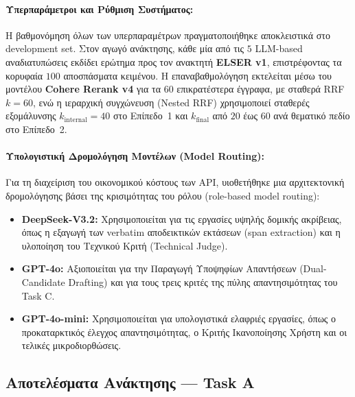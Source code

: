 \paragraph{Υπερπαράμετροι και Ρύθμιση Συστήματος:}
Η βαθμονόμηση όλων των υπερπαραμέτρων πραγματοποιήθηκε αποκλειστικά στο development set. Στον αγωγό ανάκτησης, κάθε μία από τις $5$ LLM-based αναδιατυπώσεις εκδίδει ερώτημα προς τον ανακτητή \textbf{ELSER v1}, επιστρέφοντας τα κορυφαία $100$ αποσπάσματα κειμένου. Η επαναβαθμολόγηση εκτελείται μέσω του μοντέλου \textbf{Cohere Rerank v4} για τα $60$ επικρατέστερα έγγραφα, με σταθερά RRF $k=60$, ενώ η ιεραρχική συγχώνευση (Nested RRF) χρησιμοποιεί σταθερές εξομάλυνσης $k_{\text{internal}}=40$ στο Επίπεδο~1 και $k_{\text{final}}$ από $20$ έως $60$ ανά θεματικό πεδίο στο Επίπεδο~2.

\paragraph{Υπολογιστική Δρομολόγηση Μοντέλων (Model Routing):}
Για τη διαχείριση του οικονομικού κόστους των API, υιοθετήθηκε μια αρχιτεκτονική δρομολόγησης βάσει της κρισιμότητας του ρόλου (role-based model routing):
\begin{itemize}
    \item \textbf{DeepSeek-V3.2:} Χρησιμοποιείται για τις εργασίες υψηλής δομικής ακρίβειας, όπως η εξαγωγή των verbatim αποδεικτικών εκτάσεων (span extraction) και η υλοποίηση του Τεχνικού Κριτή (Technical Judge).
    \item \textbf{GPT-4o:} Αξιοποιείται για την Παραγωγή Υποψηφίων Απαντήσεων (Dual-Candidate Drafting) και για τους τρεις κριτές της πύλης απαντησιμότητας του Task C.
    \item \textbf{GPT-4o-mini:} Χρησιμοποιείται για υπολογιστικά ελαφριές εργασίες, όπως ο προκαταρκτικός έλεγχος απαντησιμότητας, ο Κριτής Ικανοποίησης Χρήστη και οι τελικές μικροδιορθώσεις.
\end{itemize}

\subsection{Αποτελέσματα Ανάκτησης — Task A}

